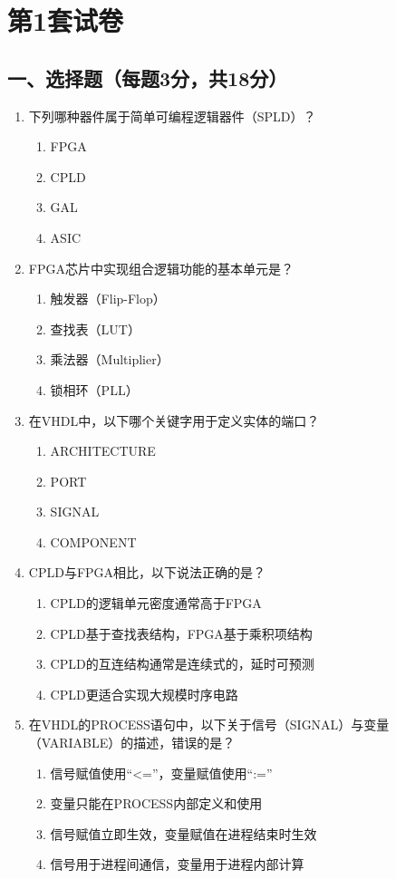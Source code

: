 \chapter{第1套试卷}

\section*{一、选择题（每题3分，共18分）}

\begin{enumerate}[label=\arabic*.]
\item 下列哪种器件属于简单可编程逻辑器件（SPLD）？
\begin{enumerate}[label=\Alph*.]
  \item FPGA
  \item CPLD
  \item GAL
  \item ASIC
\end{enumerate}

\item FPGA芯片中实现组合逻辑功能的基本单元是？
\begin{enumerate}[label=\Alph*.]
  \item 触发器（Flip-Flop）
  \item 查找表（LUT）
  \item 乘法器（Multiplier）
  \item 锁相环（PLL）
\end{enumerate}

\item 在VHDL中，以下哪个关键字用于定义实体的端口？
\begin{enumerate}[label=\Alph*.]
  \item ARCHITECTURE
  \item PORT
  \item SIGNAL
  \item COMPONENT
\end{enumerate}

\item CPLD与FPGA相比，以下说法正确的是？
\begin{enumerate}[label=\Alph*.]
  \item CPLD的逻辑单元密度通常高于FPGA
  \item CPLD基于查找表结构，FPGA基于乘积项结构
  \item CPLD的互连结构通常是连续式的，延时可预测
  \item CPLD更适合实现大规模时序电路
\end{enumerate}

\item 在VHDL的PROCESS语句中，以下关于信号（SIGNAL）与变量（VARIABLE）的描述，错误的是？
\begin{enumerate}[label=\Alph*.]
  \item 信号赋值使用“<=”，变量赋值使用“:=”
  \item 变量只能在PROCESS内部定义和使用
  \item 信号赋值立即生效，变量赋值在进程结束时生效
  \item 信号用于进程间通信，变量用于进程内部计算
\end{enumerate}


\end{enumerate}
